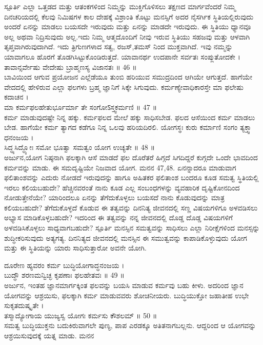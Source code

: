  ಸ್ಪೂರ್ತಿ 
 ಎಲ್ಲಾ ಒತ್ತಡದ ಮತ್ತು ಆತಂಕಗಳಿಂದ ನಿಮ್ಮನ್ನು ಮುಕ್ತಿಗೊಳಿಸಲು ತಕ್ಷಣದ ಮಾರ್ಗವೆಂದರೆ ನಿಮ್ಮ ದಿನಚರಿಯದಲ್ಲಿ ಕೆಲವು ನಿಮಿಷಗಳ ಕಾಲ ದೇಹಕ್ಕೆ ವಿಶ್ರಾಂತಿ ಕೊಟ್ಟು ಮನಸ್ಸಿಗೆ ಅದರ ನೈಸರ್ಗಿಕ ಸ್ಥಿತಿಯಲ್ಲಿರುವುದು ಅಂದರೆ ಏನನ್ನು ಮಾಡಲು ಬಯಸದೇ ಇರುವುದು ಮತ್ತು ಏನನ್ನು ಮಾಡದೇ ಇರುವುದು. ಈ ಸ್ಥಿತಿಯು ಧ್ಯಾನವೂ ಅಲ್ಲ ಅಥವಾ ನಿದ್ರಿಸುವುದು ಅಲ್ಲ.ಇದು ನಿಮ್ಮ ಆತ್ಮದೊಂದಿಗೆ ನೀವು ಇರುವ ಸ್ಥಿತಿಯು ಸಹಜವು ಮತ್ತು ಆಳವಾಗಿ ತೃಪ್ತವಾಗಿರುವುದಾಗಿದೆ. ಇದು ತ್ರಿಗುಣಗಳಾದ ಸತ್ವ, ರಜಸ್,ತಮಸ್ ನಿಂದ ಮುಕ್ತವಾಗಿದೆ. ಇವು ನಮ್ಮನ್ನು ಯಾವಾಗಲೂ ಹೊರಗೆ ತೊಡಗಿಸಿಟ್ಟುಕೊಂಡಿರುತ್ತದೆ.
ಯಾವಾನರ್ಥ ಉದಪಾನೇ ಸರ್ವತಃ ಸಂಪ್ಲುತೋದಕೇ ।\\
ತಾವಾನ್ಸರ್ವೇಷು ವೇದೇಷು ಬ್ರಾಹ್ಮಣಸ್ಯ ವಿಜಾನತಃ ॥ 46 ॥\\
 ಬಾವಿಯಿಂದ ಆಗುವ ಪ್ರಯೋಜನ ಎಲ್ಲೆಡೆಯೂ ತುಂಬಿ ಹರಿಯುವ ಸಮುದ್ರದಿಂದ ಆಗಿಯೇ ಆಗುತ್ತದೆ. ಹಾಗೆಯೇ ವೇದದಲ್ಲಿ ಹೇಳಿರುವ ಎಲ್ಲಾ ಫಲಗಳು ಬ್ರಹ್ಮ ಜ್ಞಾನಿಗೆ ಸಿಕ್ಕೇ ಸಿಗುವುದು.
ಕರ್ಮಣ್ಯೇವಾಧಿಕಾರಸ್ತೇ ಮಾ ಫಲೇಷು ಕದಾಚನ ।\\
ಮಾ ಕರ್ಮಫಲಹೇತುರ್ಭೂರ್ಮಾ ತೇ ಸಂಗೋऽಸ್ತ್ವಕರ್ಮಣಿ ॥ 47 ॥\\
 ಕರ್ಮ ಮಾಡುವುದಷ್ಟೇ ನಿನ್ನ ಹಕ್ಕು. ಕರ್ಮಫಲದ ಮೇಲೆ ಹಕ್ಕು ಸಾಧಿಸಬೇಡ. ಫಲದ ಆಸೆಯಿಂದ ಕರ್ಮ ಮಾಡಲು ಬೇಡ. ಹಾಗೆಯೇ ಕರ್ಮ ತ್ಯಾಗದ ಕಡೆಗೂ ನಿನ್ನ ಒಲವು ಹರಿಯದಿರಲಿ.
ಯೋಗಸ್ಥಃ ಕುರು ಕರ್ಮಾಣಿ ಸಂಗಂ ತ್ಯಕ್ತ್ವಾ ಧನಂಜಯ ।\\
ಸಿದ್ಧ್ಯಸಿದ್ಧ್ಯೋಃ ಸಮೋ ಭೂತ್ವಾ ಸಮತ್ವಂ ಯೋಗ ಉಚ್ಯತೇ ॥ 48 ॥\\
ಅರ್ಜುನ,ಯೋಗ ನಿಷ್ಠನಾಗಿ ಫಲಕ್ಕಾಗಿ ಆಸೆ ಮಾಡದೆ ಫಲ ದೊರೆತರೆ ಹಿಗ್ಗದೆ ಸಿಗದಿದ್ದರೆ ಕುಗ್ಗದೇ ಒಂದೇ ಭಾವದಿಂದ ಕರ್ಮವನ್ನು ಮಾಡು. ಈ ಸಮದೃಷ್ಟಿಯೇ ನಿಜವಾದ ಯೋಗ.
ಮನನ 47,48.
 ಏನನ್ನಾದರೂ ಮಾಡುವಾಗ ಫಲಿತಾಂಶವನ್ನು ಎದುರು ನೋಡದೆ ಇರುವುದನ್ನು ಹಾಗೂ ಅಹಿತಕರ ಫಲಿತಾಂಶ ಬಂದರೂ ಕೂಡ ಸಮತ್ವ ಸ್ಥಿತಿಯಲ್ಲಿ ಇರಲು ಕಲಿಯಬಹುದೇ? ಹೆಚ್ಚಿನವರಂತೆ ನಾನು ಕೂಡ ಎಲ್ಲ ಸಂಬಂಧಗಳನ್ನು ವ್ಯವಹಾರಿಕ ದೃಷ್ಟಿಕೋನದಿಂದ ನೋಡುತ್ತೇನೆಯೇ? ಯಾರಿಂದಲೂ ಏನನ್ನು ತೆಗೆದುಕೊಳ್ಳಲು ಬಯಸದೆ ನಾನು ಕೊಡುವುದನ್ನು ಮಾತ್ರ ಕಲಿಯಬಹುದೇ? ತೆಗೆದುಕೊಳ್ಳದೆ ಕೊಡುವ ಈ ತತ್ವವನ್ನು ದಿನನಿತ್ಯ ಜೀವನದಲ್ಲಿ ಸಣ್ಣ ವಿಷಯಗಳಿಗೂ ಅಳವಡಿಸಲು ಅಭ್ಯಾಸ ಮಾಡಿಕೊಳ್ಳಬಹುದೇ? ಇದರಿಂದ ಈ ತತ್ವವನ್ನು ನನ್ನ ಜೀವನದಲ್ಲಿ ದೊಡ್ಡ ದೊಡ್ಡ ವಿಷಯಗಳಿಗೆ ಅಳವಡಿಸಿಕೊಳ್ಳಲು ಸಾಧ್ಯವಾಗಬಹುದೇ?
 ಸ್ಪೂರ್ತಿ 
ಮನಸ್ಸಿನ ಸಮತ್ವವನ್ನು ಸಾಧಿಸಲು ಎಲ್ಲಾ ನಿರೀಕ್ಷೆಗಳಿಂದ ಮನಸ್ಸನ್ನು ಶುದ್ಧೀಕರಿಸುವುದು ಅತ್ಯಗತ್ಯ. ದಿನನಿತ್ಯದ ಜೀವನದಲ್ಲಿ ಮನಸ್ಸಿನ ಈ ಸಮುತ್ವವನ್ನು ಕಾಪಾಡಿಕೊಳ್ಳುವುದು ಯೋಗ ಮತ್ತು ಈ ಸ್ಥಿತಿಯನ್ನು ಯಾರು ಸಾಧಿಸುತ್ತಾರೋ ಅವನೇ ಯೋಗಿ.

ದೂರೇಣ ಹ್ಯವರಂ ಕರ್ಮ ಬುದ್ಧಿಯೋಗಾದ್ಧನಂಜಯ ।\\
ಬುದ್ಧೌ ಶರಣಮನ್ವಿಚ್ಛ ಕೃಪಣಾಃ ಫಲಹೇತವಃ ॥ 49 ॥\\
 ಅರ್ಜುನ, ಇಂತಹ ಜ್ಞಾನಮಾರ್ಗಕ್ಕಿಂತ ಫಲವನ್ನು ಬಯಸಿ ಮಾಡುವ ಕರ್ಮವು ಬಹು ಕೀಳು. ಅದರಿಂದ ಜ್ಞಾನ ಯೋಗವನ್ನು ಆಶ್ರಯಿಸು, ಫಲಕ್ಕಾಗಿ ಕರ್ಮ ಮಾಡುವವರು ಶೋಚನೀಯರು.
ಬುದ್ಧಿಯುಕ್ತೋ ಜಹಾತೀಹ ಉಭೇ ಸುಕೃತದುಷ್ಕೃತೇ ।\\
ತಸ್ಮಾದ್ಯೋಗಾಯ ಯುಜ್ಯಸ್ವ ಯೋಗಃ ಕರ್ಮಸು ಕೌಶಲಮ್ ॥ 50 ॥\\
 ಸಮತ್ವ ಬುದ್ಧಿಯುಕ್ತನು ಬದುಕಿರುವಾಗಲೇ ಪುಣ್ಯ, ಪಾಪ ಎರಡಕ್ಕೂ ಅತಿತನಾಗಬಲ್ಲನು. ಆದ್ದರಿಂದ ಆ ಯೋಗವನ್ನು ಆಶ್ರಯಿಸುವುದಕ್ಕೆ ಯತ್ನ 
ಮಾಡು.
ಮನನ


